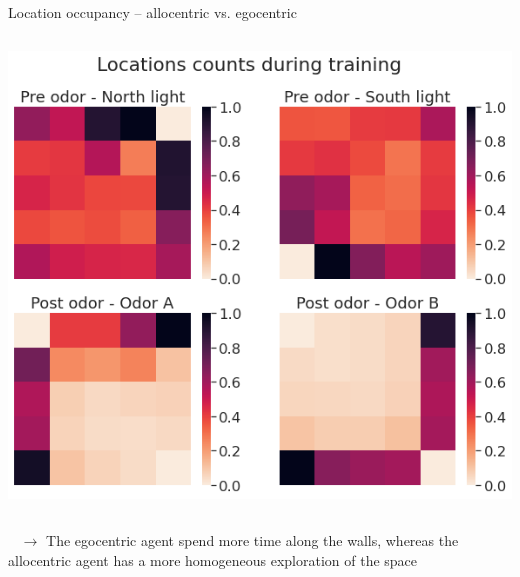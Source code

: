 \documentclass[bigger]{beamer}
\begin{document}
\begin{frame}[label={sec:orge387630}]{Location occupancy -- allocentric vs. egocentric}
\begin{columns}
\begin{column}{0.5\columnwidth}
\begin{center}
\includegraphics[width=.9\linewidth]{img/q-learning_ego_locations_count_all_steps_by_cues.png}
\end{center}
\end{column}
\end{columns}
\begin{block}{~}
\footnotesize
\vspace{-2em}
\(\to\) The egocentric agent spend more time along the walls, whereas the allocentric agent has a more homogeneous exploration of the space
\end{block}
\end{frame}
\end{document}
